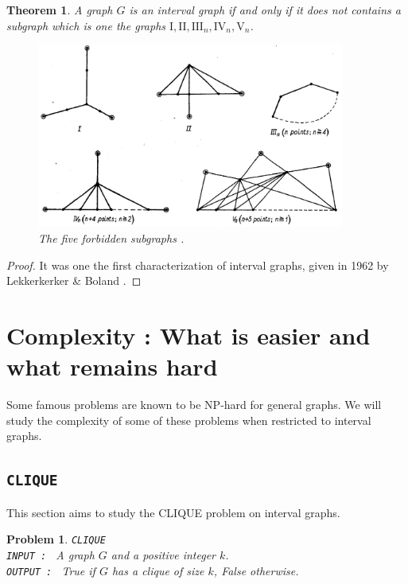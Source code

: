 \documentclass{article}
\newtheorem{theorem}{Theorem}[section]
\newtheorem{problem}{Problem}[section]
\begin{document}
\begin{theorem}
    \label{theorem:exclusion_characterization}
    A graph $G$ is an interval graph if and only if it does not contains a subgraph which is one the graphs $\mathrm{I}, \mathrm{II}, \mathrm{III}_n, \mathrm{IV}_n, \mathrm{V}_n$.
    \begin{figure}[h]
        \centering
        \includegraphics[width=0.9\textwidth]{rsc/forbidden_subgraphs.png}
        \caption{The five forbidden subgraphs \cite{boland}.}
        \label{figure:exclusion_characterization}
    \end{figure}
\end{theorem}

\begin{proof}
    It was one the first characterization of interval graphs, given in 1962 by Lekkerkerker \& Boland \cite{boland}.
\end{proof}

\section{Complexity : What is easier and what remains hard}

Some famous problems are known to be NP-hard for general graphs.
We will study the complexity of some of these problems when restricted to interval graphs.

\subsection{\texttt{CLIQUE}}

This section aims to study the CLIQUE problem on interval graphs.

\begin{problem}
    \label{problem:clique}
    \texttt{CLIQUE}\\
    \texttt{INPUT : } A graph $G$ and a positive integer $k$.\\
    \texttt{OUTPUT : } True if $G$ has a clique of size $k$, False otherwise. 
\end{problem}
\end{document}
